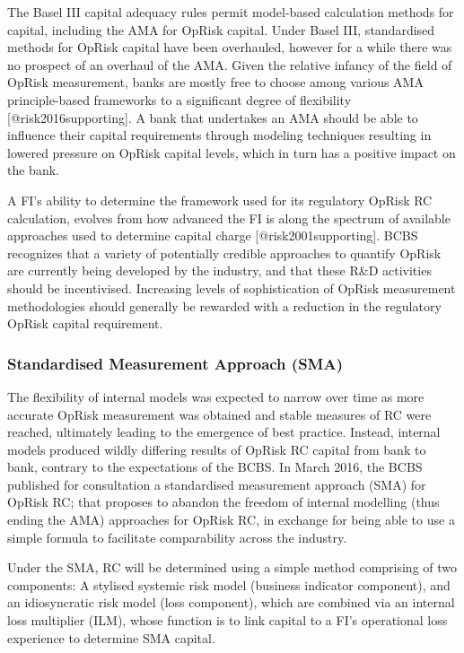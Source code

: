 \documentclass[]{article}
\begin{document}
The Basel III capital adequacy rules permit model-based calculation
methods for capital, including the AMA for OpRisk capital. Under Basel
III, standardised methods for OpRisk capital have been overhauled,
however for a while there was no prospect of an overhaul of the AMA.
Given the relative infancy of the field of OpRisk measurement, banks are
mostly free to choose among various AMA principle-based frameworks to a
significant degree of flexibility {[}@risk2016supporting{]}. A bank that
undertakes an AMA should be able to influence their capital requirements
through modeling techniques resulting in lowered pressure on OpRisk
capital levels, which in turn has a positive impact on the bank.\medskip

A FI's ability to determine the framework used for its regulatory OpRisk
RC calculation, evolves from how advanced the FI is along the spectrum
of available approaches used to determine capital charge
{[}@risk2001supporting{]}. BCBS recognizes that a variety of potentially
credible approaches to quantify OpRisk are currently being developed by
the industry, and that these R\&D activities should be incentivised.
Increasing levels of sophistication of OpRisk measurement methodologies
should generally be rewarded with a reduction in the regulatory OpRisk
capital requirement.

\subsubsection{Standardised Measurement Approach (SMA)}

The flexibility of internal models was expected to narrow over time as
more accurate OpRisk measurement was obtained and stable measures of RC
were reached, ultimately leading to the emergence of best practice.
Instead, internal models produced wildly differing results of OpRisk RC
capital from bank to bank, contrary to the expectations of the BCBS. In
March 2016, the BCBS published for consultation a standardised
measurement approach (SMA) for OpRisk RC; that proposes to abandon the
freedom of internal modelling (thus ending the AMA) approaches for
OpRisk RC, in exchange for being able to use a simple formula to
facilitate comparability across the industry.\medskip

Under the SMA, RC will be determined using a simple method comprising of
two components: A stylised systemic risk model (business indicator
component), and an idiosyncratic risk model (loss component), which are
combined via an internal loss multiplier (ILM), whose function is to
link capital to a FI's operational loss experience to determine SMA
capital.\medskip
\end{document}
